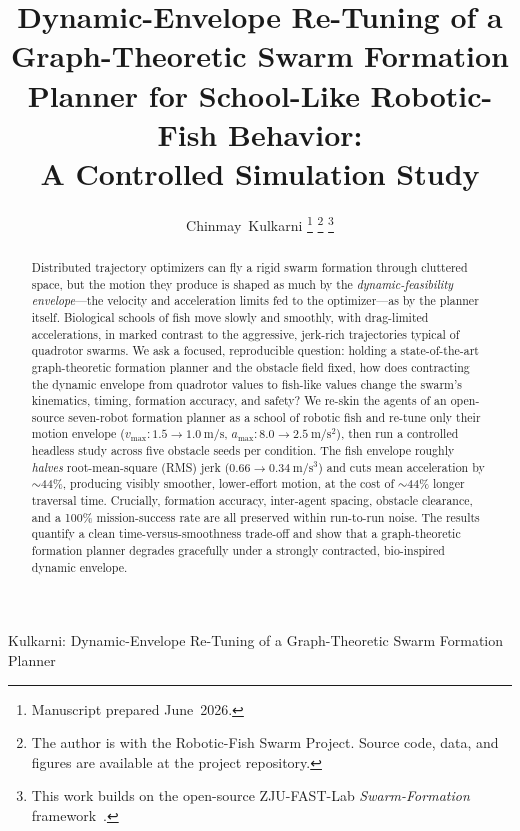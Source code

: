 \documentclass[journal]{IEEEtran}
\begin{document}
\title{Dynamic-Envelope Re-Tuning of a Graph-Theoretic Swarm
Formation Planner for School-Like Robotic-Fish Behavior:\\
A Controlled Simulation Study}

\author{Chinmay~Kulkarni%
\thanks{Manuscript prepared June~2026.}%
\thanks{The author is with the Robotic-Fish Swarm Project. Source code,
data, and figures are available at the project repository.}%
\thanks{This work builds on the open-source ZJU-FAST-Lab
\emph{Swarm-Formation} framework~\cite{quan2022distributed}.}}

%
{Kulkarni: Dynamic-Envelope Re-Tuning of a Graph-Theoretic Swarm Formation Planner}

\maketitle

\begin{abstract}
Distributed trajectory optimizers can fly a rigid swarm formation through
cluttered space, but the motion they produce is shaped as much by the
\emph{dynamic-feasibility envelope}---the velocity and acceleration limits
fed to the optimizer---as by the planner itself. Biological schools of fish
move slowly and smoothly, with drag-limited accelerations, in marked
contrast to the aggressive, jerk-rich trajectories typical of quadrotor
swarms. We ask a focused, reproducible question: holding a state-of-the-art
graph-theoretic formation planner and the obstacle field fixed, how does
contracting the dynamic envelope from quadrotor values to fish-like values
change the swarm's kinematics, timing, formation accuracy, and safety? We
re-skin the agents of an open-source seven-robot formation planner as a
school of robotic fish and re-tune only their motion envelope
($v_{\max}\!:\!1.5\!\rightarrow\!1.0~\mathrm{m/s}$,
$a_{\max}\!:\!8.0\!\rightarrow\!2.5~\mathrm{m/s^2}$), then run a controlled
headless study across five obstacle seeds per condition. The fish envelope
roughly \emph{halves} root-mean-square (RMS) jerk ($0.66\!\rightarrow\!0.34~\mathrm{m/s^3}$)
and cuts mean acceleration by $\sim$44\%, producing visibly smoother,
lower-effort motion, at the cost of $\sim$44\% longer traversal time. Crucially,
formation accuracy, inter-agent spacing, obstacle clearance, and a 100\%
mission-success rate are all preserved within run-to-run noise. The results
quantify a clean time-versus-smoothness trade-off and show that a
graph-theoretic formation planner degrades gracefully under a strongly
contracted, bio-inspired dynamic envelope.
\end{abstract}
\end{document}
